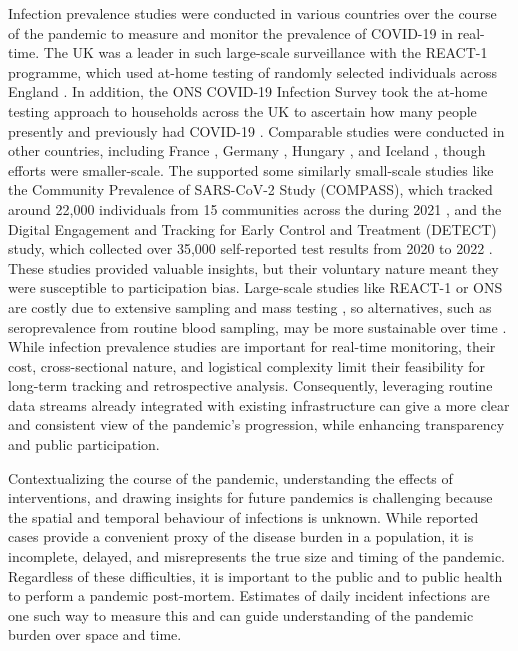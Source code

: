 Infection prevalence studies were conducted in various countries over the course
of the pandemic to measure and monitor the prevalence of COVID-19 in real- time.
The UK was a leader in such large-scale surveillance with the REACT-1 programme,
which used at-home testing of randomly selected individuals across England
\citep{react12022}. In addition, the ONS COVID-19 Infection Survey took the
at-home testing approach to households across the UK to ascertain how many
people presently and previously had COVID-19 \citep{CIS2020}. Comparable studies
were conducted in other countries, including France \citep{vaux2023sars},
Germany \citep{jacob2021prevalence}, Hungary \citep{merkely2020novel}, and
Iceland \citep{gudbjartsson2020spread}, though efforts were smaller-scale. The
\US supported some similarly small-scale studies like the Community Prevalence
of SARS-CoV-2 Study (COMPASS), which tracked around 22,000 individuals from 15
communities across the during 2021 \citep{justman2024prevalence}, and the
Digital Engagement and Tracking for Early Control and Treatment (DETECT) study,
which collected over 35,000 self-reported test results from 2020 to 2022
\citep{kolb2023prevalence}. These studies provided valuable insights, but their
voluntary nature meant they were susceptible to participation bias. Large-scale
studies like REACT-1 or ONS are costly due to extensive sampling and mass
testing \citep{pavelka2021impact}, so alternatives, such as seroprevalence from
routine blood sampling, may be more sustainable over time
\citep{serotaskforce2023}. While infection prevalence studies are important for
real-time monitoring, their cost, cross-sectional nature, and logistical
complexity limit their feasibility for long-term tracking and retrospective
analysis. Consequently, leveraging routine data streams already integrated with
existing infrastructure can give a more clear and consistent view of the
pandemic's progression, while enhancing transparency and public participation. 

Contextualizing the course of the pandemic, understanding the effects of
interventions, and drawing insights for future pandemics is challenging because
the spatial and temporal behaviour of infections is unknown. While reported
cases provide a convenient proxy of the disease burden in a population, it is
incomplete, delayed, and misrepresents the true size and timing of the pandemic.
Regardless of these difficulties, it is important to the public and to public
health to perform a pandemic post-mortem. Estimates of daily incident infections
are one such way to measure this and can guide understanding of the pandemic
burden over space and time. 

